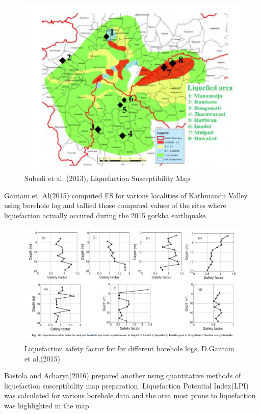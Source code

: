\begin{figure}[!hbt]
\centering
\includegraphics[width=0.75\linewidth,keepaspectratio]{images/main/dipendra.png}
\caption{Subedi et al. (2013), Liquefaction Susceptibility Map}
\end{figure}

Gautam et. Al(2015)\cite{r18} computed FS for various localities of Kathmandu Valley using borehole log and tallied those computed values of the sites where liquefaction actually occured during the 2015 gorkha earthquake.

\begin{figure}[!hbt]
\centering
\includegraphics[width=0.75\linewidth,keepaspectratio]{images/main/bastola_acharya.png}
\caption{Liquefaction safety factor for for different borehole logs, D.Gautam et al.(2015)}
\end{figure}

Bastola and Acharya(2016)\cite{r31} prepared another using quantitative methods of  liquefaction susceptibility map preparation. Liquefaction Potential Index(LPI) was calculated for various borehole data and the area most prone to liquefaction was highlighted in the map. 

